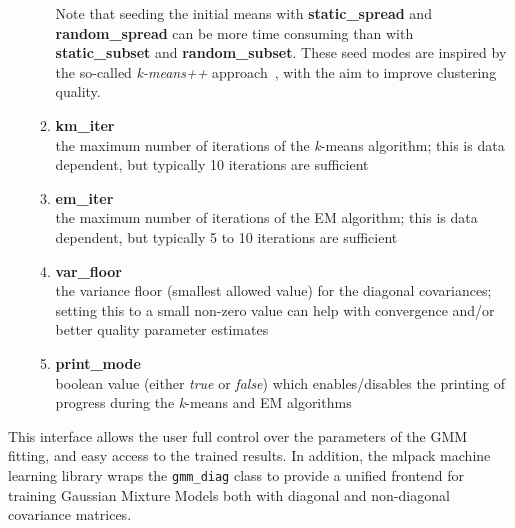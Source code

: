 \begin{itemize}
\begin{enumerate}[{$\cdot$}]
Note that seeding the initial means with {\bf static\_spread} and {\bf random\_spread}
can be more time consuming than with {\bf static\_subset} and {\bf random\_subset}.
These seed modes are inspired by the so-called {\it k-means++} approach~\cite{Arthur_2007}, with the aim to improve clustering quality.

\item
{\bf km\_iter}\\
the maximum number of iterations of the {\it k}-means algorithm; this is data dependent, but typically 10 iterations are sufficient

\item
{\bf em\_iter}\\
the maximum number of iterations of the EM algorithm; this is data dependent, but typically 5 to 10 iterations are sufficient

\item
{\bf var\_floor}\\
the variance floor (smallest allowed value) for the diagonal covariances; setting this to a small non-zero value can help with convergence and/or better quality parameter estimates

\item
{\bf print\_mode}\\
boolean value (either {\it true} or {\it false}) which enables/disables the printing of progress during the {\it k}-means and EM algorithms 

\end{enumerate}
\end{itemize}

This interface allows the user full control over the parameters of the GMM
fitting, and easy access to the trained results.  In addition, the mlpack
machine learning library \cite{Curtin_2013} wraps the {\tt gmm\_diag} class to
provide a unified frontend for training Gaussian Mixture Models both with
diagonal and non-diagonal covariance matrices.

